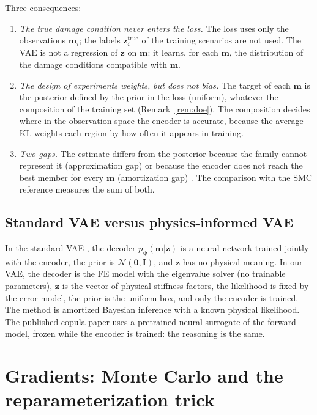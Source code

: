 \documentclass[11pt,a4paper]{article}
\numberwithin{equation}{section}
\theoremstyle{plain}
\theoremstyle{definition}
\theoremstyle{remark}
\newcommand{\m}{\mathbf{m}}
\newcommand{\z}{\mathbf{z}}
\newcommand{\I}{\mathbf{I}}
\newcommand{\N}{\mathcal{N}}
\begin{document}
Three consequences:
\begin{enumerate}
\item \emph{The true damage condition never enters the loss.} The loss uses only the observations $\m_i$; the labels $\z^{\text{true}}_i$ of the training scenarios are not used. The VAE is not a regression of $\z$ on $\m$: it learns, for each $\m$, the distribution of the damage conditions compatible with $\m$.
\item \emph{The design of experiments weights, but does not bias.} The target of each $\m$ is the posterior defined by the prior in the loss (uniform), whatever the composition of the training set (Remark~\ref{rem:doe}). The composition decides where in the observation space the encoder is accurate, because the average KL weights each region by how often it appears in training.
\item \emph{Two gaps.} The estimate differs from the posterior because the family cannot represent it (approximation gap) or because the encoder does not reach the best member for every $\m$ (amortization gap) \cite{cremer2018}. The comparison with the SMC reference measures the sum of both.
\end{enumerate}

\subsection{Standard VAE versus physics-informed VAE}
In the standard VAE \cite{kingma2014vae}, the decoder $p_{\bm\psi}(\m|\z)$ is a neural network trained jointly with the encoder, the prior is $\N(\mathbf0,\I)$, and $\z$ has no physical meaning. In our VAE, the decoder is the FE model with the eigenvalue solver (no trainable parameters), $\z$ is the vector of physical stiffness factors, the likelihood is fixed by the error model, the prior is the uniform box, and only the encoder is trained. The method is amortized Bayesian inference with a known physical likelihood. The published copula paper \cite{fernandez2026pem} uses a pretrained neural surrogate of the forward model, frozen while the encoder is trained: the reasoning is the same.

\section{Gradients: Monte Carlo and the reparameterization trick}
\label{sec:reparam}
\end{document}
